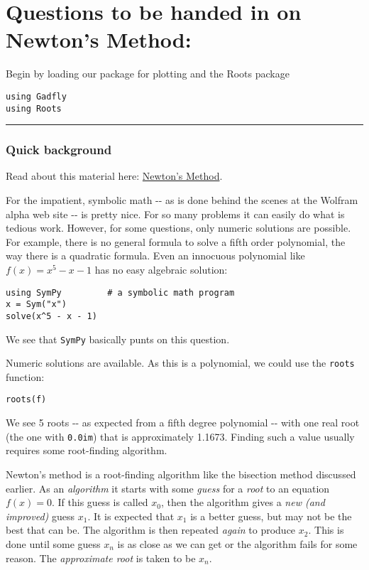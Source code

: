 \documentclass[12pt]{article}
\begin{document}
\section{Questions to be handed in on Newton's Method:}

Begin by loading our package for plotting and the Roots package



\begin{verbatim}
using Gadfly            
using Roots
\end{verbatim}
\begin{center}\rule{3in}{0.4pt}\end{center}

\subsubsection{Quick background}

Read about this material here:
\href{http://mth229.github.io/newton.html}{Newton's Method}.

For the impatient, symbolic math -{}- as is done behind the scenes at
the Wolfram alpha web site -{}- is pretty nice. For so many problems it
can easily do what is tedious work. However, for some questions, only
numeric solutions are possible. For example, there is no general formula
to solve a fifth order polynomial, the way there is a quadratic formula.
Even an innocuous polynomial like $f(x) = x^5 - x - 1$ has no easy
algebraic solution:



\begin{verbatim}
using SymPy         # a symbolic math program
x = Sym("x")
solve(x^5 - x - 1)
\end{verbatim}
We see that \texttt{SymPy} basically punts on this question.

Numeric solutions are available. As this is a polynomial, we could use
the \texttt{roots} function:



\begin{verbatim}
roots(f)
\end{verbatim}
We see 5 roots -{}- as expected from a fifth degree polynomial -{}- with
one real root (the one with \texttt{0.0im}) that is approximately
1.1673. Finding such a value usually requires some root-finding
algorithm.

Newton's method is a root-finding algorithm like the bisection method
discussed earlier. As an \emph{algorithm} it starts with some
\emph{guess} for a \emph{root} to an equation $f(x) = 0$. If this guess
is called $x_0$, then the algorithm gives a \emph{new (and improved)}
guess $x_1$. It is expected that $x_1$ is a better guess, but may not be
the best that can be. The algorithm is then repeated \emph{again} to
produce $x_2$. This is done until some guess $x_n$ is as close as we can
get or the algorithm fails for some reason. The \emph{approximate root}
is taken to be $x_n$.
\end{document}
